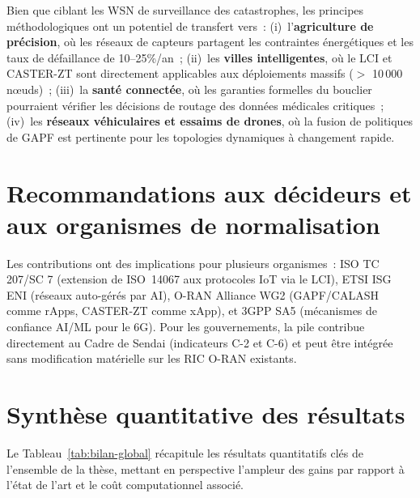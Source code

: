 Bien que ciblant les WSN de surveillance des catastrophes, les principes méthodologiques ont un potentiel de transfert vers~: (i)~l'\textbf{agriculture de précision}, où les réseaux de capteurs partagent les contraintes énergétiques et les taux de défaillance de 10--25\%/an~; (ii)~les \textbf{villes intelligentes}, où le LCI et CASTER-ZT sont directement applicables aux déploiements massifs ($>$ 10\,000 n\oe{}uds)~; (iii)~la \textbf{santé connectée}, où les garanties formelles du bouclier pourraient vérifier les décisions de routage des données médicales critiques~; (iv)~les \textbf{réseaux véhiculaires et essaims de drones}, où la fusion de politiques de GAPF est pertinente pour les topologies dynamiques à changement rapide.


\section{Recommandations aux décideurs et aux organismes de normalisation}\label{sec:concl-institutions}

Les contributions ont des implications pour plusieurs organismes~: ISO TC 207/SC 7 (extension de ISO~14067 aux protocoles IoT via le LCI), ETSI ISG ENI (réseaux auto-gérés par AI), O-RAN Alliance WG2 (GAPF/CALASH comme rApps, CASTER-ZT comme xApp), et 3GPP SA5 (mécanismes de confiance AI/ML pour le 6G). Pour les gouvernements, la pile contribue directement au Cadre de Sendai \cite{UNDRR2015Sendai} (indicateurs C-2 et C-6) et peut être intégrée sans modification matérielle sur les RIC O-RAN existants.


\section{Synthèse quantitative des résultats}\label{sec:concl-bilan}

Le Tableau~\ref{tab:bilan-global} récapitule les résultats quantitatifs clés de l'ensemble de la thèse, mettant en perspective l'ampleur des gains par rapport à l'état de l'art et le coût computationnel associé.

